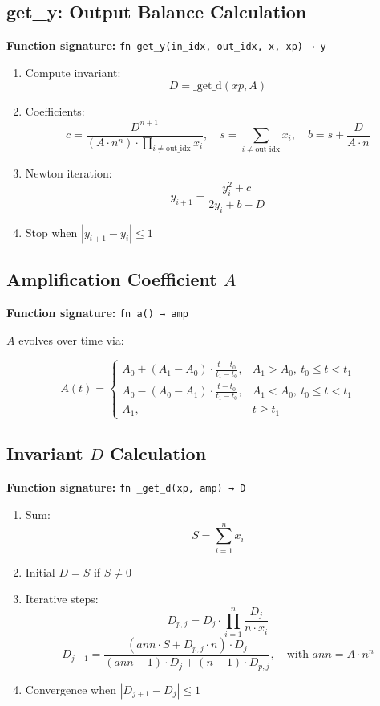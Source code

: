\documentclass[12pt]{article}
\begin{document}
\subsection{get\_y: Output Balance Calculation}

\textbf{Function signature:} \verb|fn get_y(in_idx, out_idx, x, xp) → y|

\begin{enumerate}
    \item Compute invariant:
    \[
    D = \text{\_get\_d}(xp, A)
    \]

    \item Coefficients:
    \[
    c = \frac{D^{n+1}}{(A \cdot n^n) \cdot \prod_{i \neq \text{out\_idx}} x_i}, \quad s = \sum_{i \neq \text{out\_idx}} x_i, \quad b = s + \frac{D}{A \cdot n}
    \]

    \item Newton iteration:
    \[
    y_{i+1} = \frac{y_i^2 + c}{2y_i + b - D}
    \]

    \item Stop when $|y_{i+1} - y_i| \leq 1$
\end{enumerate}

\subsection{Amplification Coefficient $A$}

\textbf{Function signature:} \verb|fn a() → amp|

$A$ evolves over time via:

\[
A(t) = 
\begin{cases}
A_0 + (A_1 - A_0) \cdot \frac{t - t_0}{t_1 - t_0}, & A_1 > A_0,\ t_0 \leq t < t_1 \\
A_0 - (A_0 - A_1) \cdot \frac{t - t_0}{t_1 - t_0}, & A_1 < A_0,\ t_0 \leq t < t_1 \\
A_1, & t \geq t_1
\end{cases}
\]

\subsection{Invariant $D$ Calculation}

\textbf{Function signature:} \verb|fn _get_d(xp, amp) → D|

\begin{enumerate}
    \item Sum:
    \[
    S = \sum_{i=1}^{n} x_i
    \]

    \item Initial $D = S$ if $S \ne 0$

    \item Iterative steps:
    \[
    D_{p,j} = D_j \cdot \prod_{i=1}^{n} \frac{D_j}{n \cdot x_i}
    \]
    \[
    D_{j+1} = \frac{(ann \cdot S + D_{p,j} \cdot n) \cdot D_j}{(ann - 1) \cdot D_j + (n + 1) \cdot D_{p,j}}, \quad \text{with } ann = A \cdot n^n
    \]

    \item Convergence when $|D_{j+1} - D_j| \leq 1$
\end{enumerate}
\end{document}
